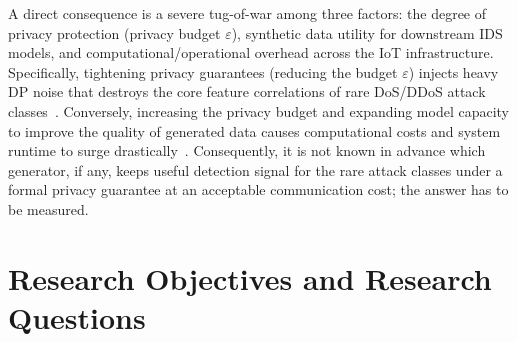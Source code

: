 A direct consequence is a severe tug-of-war among three factors: the degree of privacy protection (privacy budget $\varepsilon$), synthetic data utility for downstream IDS models, and computational/operational overhead across the IoT infrastructure. Specifically, tightening privacy guarantees (reducing the budget $\varepsilon$) injects heavy DP noise that destroys the core feature correlations of rare DoS/DDoS attack classes~\cite{zhang2017privbayes, mckenna2024aim}. Conversely, increasing the privacy budget and expanding model capacity to improve the quality of generated data causes computational costs and system runtime to surge drastically~\cite{mckenna2024aim}. Consequently, it is not known in advance which generator, if any, keeps useful detection signal for the rare attack classes under a formal privacy guarantee at an acceptable communication cost; the answer has to be measured.
\clearpage
\section{Research Objectives and Research Questions}

\frenchspacing
